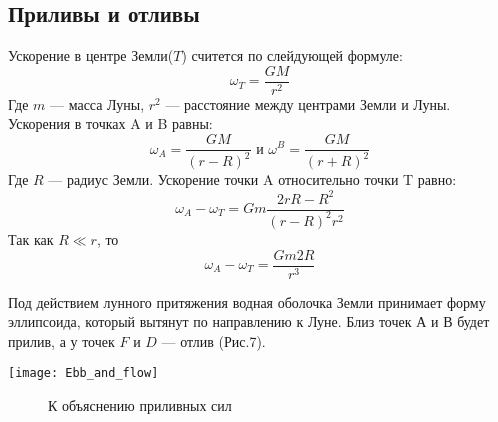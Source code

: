 \subsection{Приливы и отливы}
Ускорение в центре Земли($T$) считется по слейдующей формуле: $$\omega_T=\frac{GM}{r^2}$$
Где $m$ --- масса Луны, $r^2$ --- расстояние между центрами Земли и Луны. Ускорения в точках A и B равны:
$$\omega_A=\frac{GM}{(r-R)^2} \text{ и } \omega^B=\frac{GM}{(r+R)^2}$$
Где $R$ --- радиус Земли. Ускорение точки A относительно точки T равно:
$$\omega_A-\omega_T=Gm\frac{2rR-R^2}{(r-R)^2r^2}$$
Так как $R\ll r$, то $$\omega_A-\omega_T=\frac{Gm2R}{r^3}$$

Под действием лунного притяжения водная оболочка Земли принимает форму эллипсоида, который вытянут по направлению к Луне. Близ точек $А$ и $В$ будет прилив, а у точек $F$ и $D$ --- отлив (Рис.7).
\begin{center}
\texttt{[image: Ebb\_and\_flow]}
\begin{figure}[h!]
\caption{К объяснению приливных сил}
\end{figure}
\end{center}
